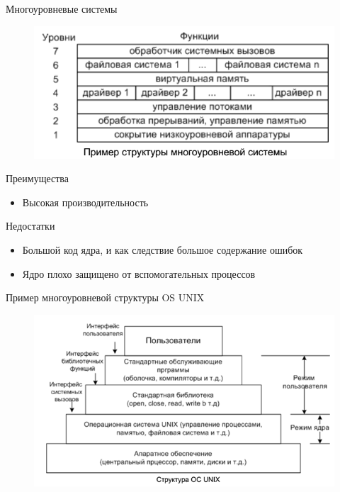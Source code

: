 \documentclass{beamer}
\begin{document}
\begin{frame}[t]
Многоуровневые системы
\begin{figure}[h]
\centering
\includegraphics[scale=0.6]{images/lec01-pic03.png}
\end{figure}
Преимущества 
\begin{itemize}
\item Высокая производительность
\end{itemize}
Недостатки 
\begin{itemize}
\item Большой код ядра, и как следствие большое содержание ошибок
\item Ядро плохо защищено от вспомогательных процессов
\end{itemize}
\end{frame}

\begin{frame}[t]
Пример многоуровневой структуры OS UNIX
\begin{figure}[h]
\centering
\includegraphics[scale=0.7]{images/lec01-pic04.png}
\end{figure}
\end{frame}
\end{document}
